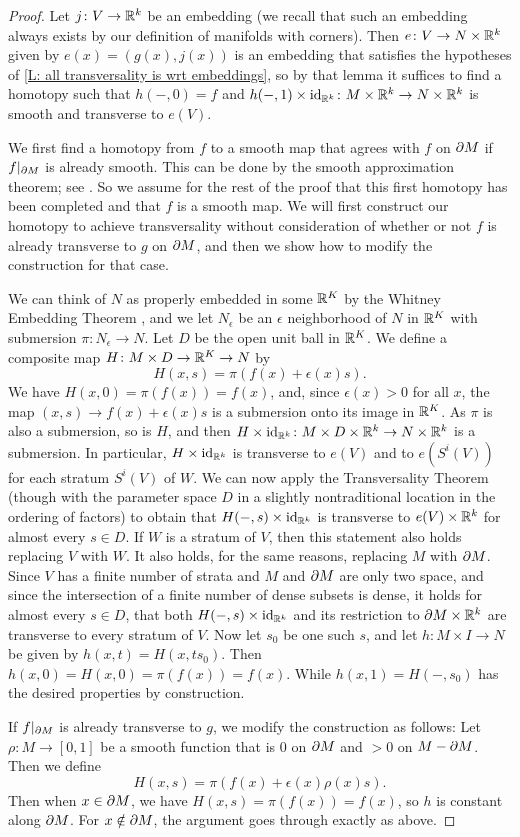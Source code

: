 \begin{proof}
	Let $j \colon V\to \mathbb{R}^k$ be an embedding (we recall that such an embedding always exists by our definition of manifolds with corners).
	Then $e \colon V\to N\times \mathbb{R}^k$ given by $e(x)=(g(x),j(x))$ is an embedding that satisfies the hypotheses of \cref{L: all transversality is wrt embeddings}, so by that lemma it suffices to find a homotopy such that $h(-,0)=f$ and $h(-,1)\times \mathrm{id}_{\mathbb{R}^k} \colon M\times \mathbb{R}^k\to N\times \mathbb{R}^k$ is smooth and
	transverse to $e(V)$.

	We first find a homotopy from $f$ to a smooth map that agrees with $f$ on $\partial M$ if $f|_{\partial M}$ is already smooth.
	This can be done by the smooth approximation theorem; see \cite[Theorem III.2.5]{Kos93}.
	So we assume for the rest of the proof that this first homotopy has been completed and that $f$ is a smooth map.
	We will first construct our homotopy to achieve transversality without consideration of whether or not $f$ is already transverse to $g$ on $\partial M$, and then we show how to modify the construction for that case.

	We can think of $N$ as properly embedded in some $\mathbb{R}^K$ by the Whitney Embedding Theorem \cite[Section 1.8]{GuPo74}, and we let $N_\epsilon$ be an $\epsilon$ neighborhood of $N$ in $\mathbb{R}^K$ with submersion $\pi \colon N_\epsilon\to N$.
	Let $D$ be the open unit ball in $\mathbb{R}^K$.
	We define a composite map $H \colon M\times D\to \mathbb{R}^K\to N$ by
	$$H(x,s)=\pi(f(x)+ \epsilon(x)s).$$
	We have $H(x,0)=\pi(f(x))=f(x)$, and, since $\epsilon(x)>0$ for all $x$, the map $(x,s)\to f(x)+ \epsilon(x)s$ is a submersion onto its image in $\mathbb{R}^K$.
	As $\pi$ is also a submersion, so is $H$, and then $H\times \mathrm{id}_{\mathbb{R}^k} \colon M\times D\times \mathbb{R}^k\to N\times \mathbb{R}^k$ is a submersion.
	In particular, $H\times \mathrm{id}_{\mathbb{R}^k}$ is transverse to $e(V)$ and to $e(S^i(V))$ for each stratum $S^i(V)$ of $W$.
	We can now apply the Transversality Theorem (though with the parameter space $D$ in a slightly nontraditional location in the ordering of factors) to obtain that $H(-,s)\times \mathrm{id}_{\mathbb{R}^k}$ is transverse to $e(V)\times \mathbb{R}^k$ for almost every $s\in D$.
	If $W$ is a stratum of $V$, then this statement also holds replacing $V$ with $W$.
	It also holds, for the same reasons, replacing $M$ with $\partial M$.
	Since $V$ has a finite number of strata and $M$ and $\partial M$ are only two space, and since the intersection of a finite number of dense subsets is dense, it holds for almost every $s\in D$, that both $H(-,s)\times \mathrm{id}_{\mathbb{R}^k}$ and its restriction to $\partial M\times \mathbb{R}^k$ are transverse to every stratum of $V$.
	Now let $s_0$ be one such $s$, and let $h \colon M\times I\to N$ be given by $h(x,t)=H(x,ts_0)$.
	Then $h(x,0)=H(x,0)=\pi(f(x))=f(x)$.
	While $h(x,1)=H(-,s_0)$ has the desired properties by construction.

	If $f|_{\partial M}$ is already transverse to $g$, we modify the construction as follows: Let $\rho \colon M\to [0,1]$ be a smooth function that is $0$ on $\partial M$ and $>0$ on $M-\partial M$.
	Then we define
	$$H(x,s)=\pi(f(x)+ \epsilon(x)\rho(x)s).$$
	Then when $x\in \partial M$, we have $H(x,s)=\pi(f(x))=f(x)$, so $h$ is constant along $\partial M$.
	For $x\notin \partial M$, the argument goes through exactly as above.
\end{proof}

